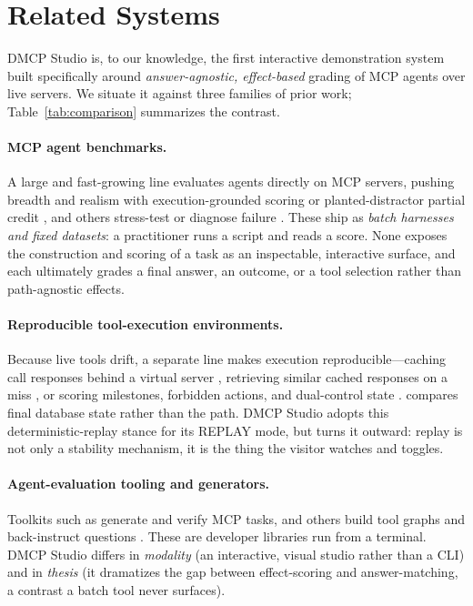 \section{Related Systems}
\label{sec:related}

DMCP Studio is, to our knowledge, the first interactive demonstration system
built specifically around \emph{answer-agnostic, effect-based} grading of
MCP agents over live servers. We situate it against three families of prior
work; Table~\ref{tab:comparison} summarizes the contrast.



\paragraph{MCP agent benchmarks.} A large and fast-growing line evaluates
agents directly on MCP servers, pushing breadth and realism
\citep{fan2025mcptoolbench++, mo2025livemcpbench, lei2025mcpverse,
wang2025mcp} with execution-grounded scoring \citep{servers25mcp,
gao2025mcp} or planted-distractor partial credit \citep{bandi2026mcp}, and
others stress-test or diagnose failure \citep{wu2025mcpmark, yin2025livemcp,
guo2026mcp}. These ship as \emph{batch harnesses and fixed datasets}: a
practitioner runs a script and reads a score. None exposes the construction
and scoring of a task as an inspectable, interactive surface, and each
ultimately grades a final answer, an outcome, or a tool selection rather
than path-agnostic effects.

\paragraph{Reproducible tool-execution environments.} Because live tools
drift, a separate line makes execution reproducible---caching call responses
behind a virtual server \citep{guo2024stabletoolbench, guo2025stabletoolbench},
retrieving similar cached responses on a miss \citep{cheng2025travelbench},
or scoring milestones, forbidden actions, and dual-control state
\citep{lu2025toolsandbox, barres2025tau}. \citet{yao2024tau} compares final
database state rather than the path. DMCP Studio adopts this deterministic-replay
stance for its REPLAY mode, but turns it outward: replay is not only a
stability mechanism, it is the thing the visitor watches and toggles.

\paragraph{Agent-evaluation tooling and generators.} Toolkits such as
\citet{liu2025mcpeval} generate and verify MCP tasks, and others build tool
graphs and back-instruct questions \citep{shen2024taskbench,
guo2026unitoolbench, shi2025taskcraft}. These are developer libraries run
from a terminal. DMCP Studio differs in \emph{modality} (an interactive,
visual studio rather than a CLI) and in \emph{thesis} (it dramatizes the
gap between effect-scoring and answer-matching, a contrast a batch tool
never surfaces).

